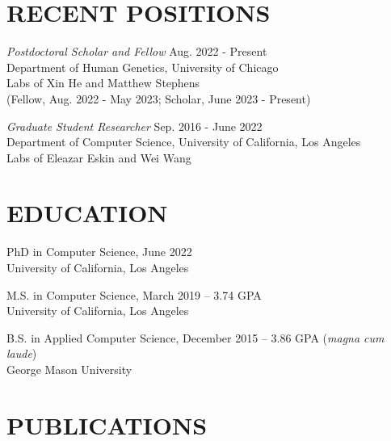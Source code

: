 \documentclass[margin, 10pt]{res} %
\begin{document}
\begin{resume}


\section{RECENT POSITIONS}

{\sl Postdoctoral Scholar and Fellow} \hfill Aug. 2022 - Present \\ Department of Human Genetics, University of Chicago \\ Labs of Xin He and Matthew Stephens \\
(Fellow, Aug. 2022 - May 2023; Scholar, June 2023 - Present)

{\sl Graduate Student Researcher} \hfill Sep. 2016 - June 2022 \\ Department of Computer Science, University of California, Los Angeles \\ Labs of Eleazar Eskin and Wei Wang



\section{EDUCATION}

PhD in Computer Science, June 2022 \\
University of California, Los Angeles

M.S. in Computer Science, March 2019 -- 3.74 GPA \\
University of California, Los Angeles

B.S. in Applied Computer Science, December 2015 -- 3.86 GPA ({\sl magna cum laude}) \\
George Mason University
  

\section{PUBLICATIONS}


\end{resume}
\end{document}
